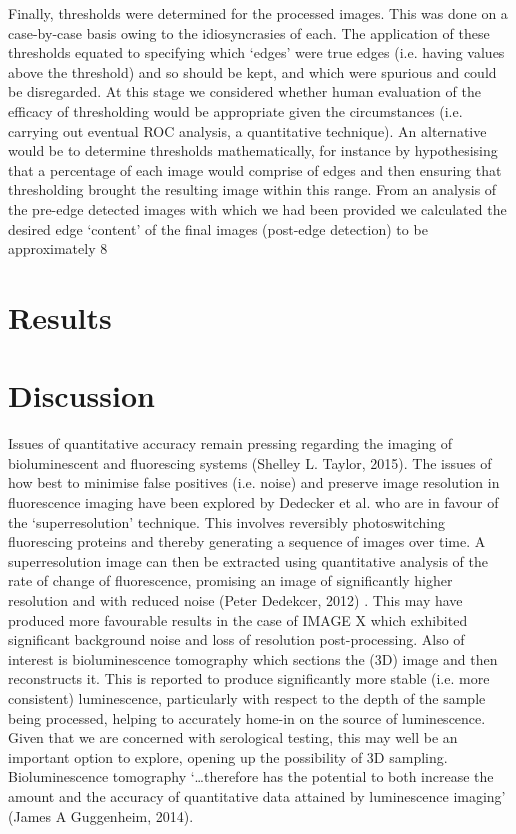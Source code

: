 \documentclass[a4paper]{article}
\begin{document}
\begin{multicols*}{2}
Finally, thresholds were determined for the processed images. This was done on a case-by-case basis owing to the idiosyncrasies of each. The application of these thresholds equated to specifying which ‘edges’ were true edges (i.e. having values above the threshold) and so should be kept, and which were spurious and could be disregarded. At this stage we considered whether human evaluation of the efficacy of thresholding would be appropriate given the circumstances (i.e. carrying out eventual ROC analysis, a quantitative technique). An alternative would be to determine thresholds mathematically, for instance by hypothesising that a percentage of each image would comprise of edges and then ensuring that thresholding brought the resulting image within this range. From an analysis of the pre-edge detected images with which we had been provided we calculated the desired edge ‘content’ of the final images (post-edge detection) to be approximately 8%

\section*{Results}

\section*{Discussion}

Issues of quantitative accuracy remain pressing regarding the imaging of bioluminescent and fluorescing systems (Shelley L. Taylor, 2015). 
The issues of how best to minimise false positives (i.e. noise) and preserve image resolution in fluorescence imaging have been explored by Dedecker et al. who are in favour of the ‘superresolution’ technique. This involves reversibly photoswitching fluorescing proteins and thereby generating a sequence of images over time. A superresolution image can then be extracted using quantitative analysis of the rate of change of fluorescence, promising an image of significantly higher resolution and with reduced noise (Peter Dedekcer, 2012) . This may have produced more favourable results in the case of IMAGE X which exhibited significant background noise and loss of resolution post-processing.
Also of interest is bioluminescence tomography which sections the (3D) image and then reconstructs it. This is reported to produce significantly more stable (i.e. more consistent) luminescence, particularly with respect to the depth of the sample being processed, helping to accurately home-in on the source of luminescence. Given that we are concerned with serological testing, this may well be an important option to explore, opening up the possibility of 3D sampling. Bioluminescence tomography ‘…therefore has the potential to both increase the amount and the accuracy of quantitative data attained by luminescence imaging’ (James A Guggenheim, 2014).


\end{multicols*}
\end{document}
